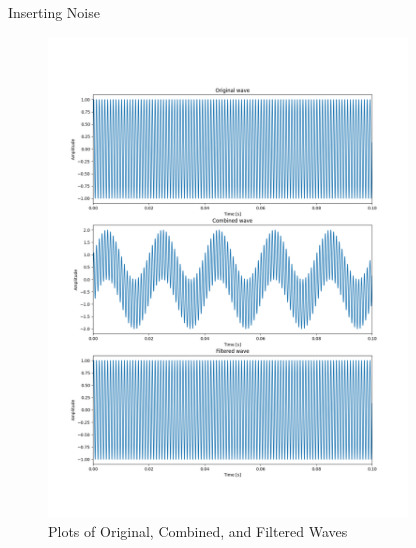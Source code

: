 \begin{hwkProblem}{6.1}{Inserting Noise}
	\begin{figure}[ht!]
	  \centering
	  \includegraphics[width=0.85\textwidth]{./6.1.5.png}
	  \caption{Plots of Original, Combined, and Filtered Waves}
	\end{figure}

\end{hwkProblem}

